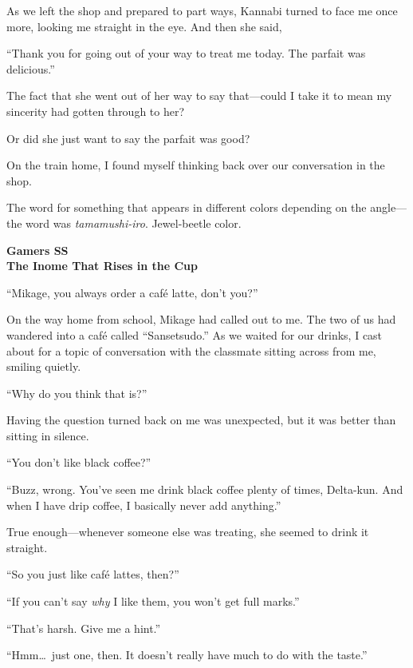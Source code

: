 \documentclass[
    a4paper,
    12pt,
    twoside,
    openany,
    UTF8,
    fontset=windows
]{ctexbook}
\begin{document}
As we left the shop and prepared to part ways, Kannabi turned to face me once more, looking me straight in the eye. And then she said,

``Thank you for going out of your way to treat me today. The parfait was delicious.''

The fact that she went out of her way to say that---could I take it to mean my sincerity had gotten through to her?

Or did she just want to say the parfait was good?

On the train home, I found myself thinking back over our conversation in the shop.

The word for something that appears in different colors depending on the angle---the word was \textit{tamamushi-iro}. Jewel-beetle color.

\clearpage
\thispagestyle{plain}
\begin{center}
    \large\bfseries
    Gamers SS\\
    The Inome That Rises in the Cup
\end{center}
\label{sec:gamer}
\vspace{1cm}

``Mikage, you always order a café latte, don't you?''

On the way home from school, Mikage had called out to me. The two of us had wandered into a café called ``Sansetsudo.'' As we waited for our drinks, I cast about for a topic of conversation with the classmate sitting across from me, smiling quietly.

``Why do you think that is?''

Having the question turned back on me was unexpected, but it was better than sitting in silence.

``You don't like black coffee?''

``Buzz, wrong. You've seen me drink black coffee plenty of times, Delta-kun. And when I have drip coffee, I basically never add anything.''

True enough---whenever someone else was treating, she seemed to drink it straight.

``So you just like café lattes, then?''

``If you can't say \textit{why} I like them, you won't get full marks.''

``That's harsh. Give me a hint.''

``Hmm\dots\ just one, then. It doesn't really have much to do with the taste.''
\end{document}
